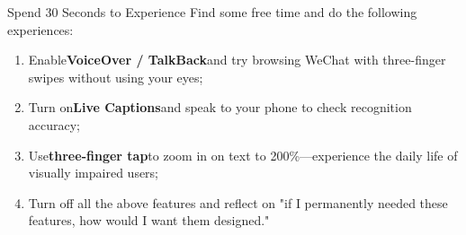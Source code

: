 \begin{tcbpractice}{Spend 30 Seconds to Experience}
Find some free time and do the following experiences:

\begin{enumerate}
  \item Enable\textbf{VoiceOver / TalkBack}and try browsing WeChat with three-finger swipes without using your eyes;
  \item Turn on\textbf{Live Captions}and speak to your phone to check recognition accuracy;
  \item Use\textbf{three-finger tap}to zoom in on text to 200\%—experience the daily life of visually impaired users;
  \item Turn off all the above features and reflect on "if I permanently needed these features, how would I want them designed."
\end{enumerate}

\end{tcbpractice}
